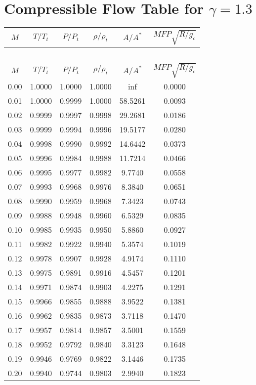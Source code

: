 \documentclass{article}
\begin{document}
\section*{Compressible Flow Table for $\gamma = 1.3$}
\begin{longtable}{cccccc}  %

\toprule
$M$ & $T/T_t$ & $P/P_t$ & $\rho/\rho_t$ & $A/A^*$ & $MFP\sqrt{R/g_c}$ \\
\midrule
\endfirsthead
\multicolumn{6}{c}{~} \\
\toprule
$M$ & $T/T_t$ & $P/P_t$ & $\rho/\rho_t$ & $A/A^*$ & $MFP\sqrt{R/g_c}$ \\
\midrule
\endhead
0.00 & 1.0000 & 1.0000 & 1.0000 & inf & 0.0000 \\
0.01 & 1.0000 & 0.9999 & 1.0000 & 58.5261 & 0.0093 \\
0.02 & 0.9999 & 0.9997 & 0.9998 & 29.2681 & 0.0186 \\
0.03 & 0.9999 & 0.9994 & 0.9996 & 19.5177 & 0.0280 \\
0.04 & 0.9998 & 0.9990 & 0.9992 & 14.6442 & 0.0373 \\
0.05 & 0.9996 & 0.9984 & 0.9988 & 11.7214 & 0.0466 \\
0.06 & 0.9995 & 0.9977 & 0.9982 & 9.7740 & 0.0558 \\
0.07 & 0.9993 & 0.9968 & 0.9976 & 8.3840 & 0.0651 \\
0.08 & 0.9990 & 0.9959 & 0.9968 & 7.3423 & 0.0743 \\
0.09 & 0.9988 & 0.9948 & 0.9960 & 6.5329 & 0.0835 \\
0.10 & 0.9985 & 0.9935 & 0.9950 & 5.8860 & 0.0927 \\
0.11 & 0.9982 & 0.9922 & 0.9940 & 5.3574 & 0.1019 \\
0.12 & 0.9978 & 0.9907 & 0.9928 & 4.9174 & 0.1110 \\
0.13 & 0.9975 & 0.9891 & 0.9916 & 4.5457 & 0.1201 \\
0.14 & 0.9971 & 0.9874 & 0.9903 & 4.2275 & 0.1291 \\
0.15 & 0.9966 & 0.9855 & 0.9888 & 3.9522 & 0.1381 \\
0.16 & 0.9962 & 0.9835 & 0.9873 & 3.7118 & 0.1470 \\
0.17 & 0.9957 & 0.9814 & 0.9857 & 3.5001 & 0.1559 \\
0.18 & 0.9952 & 0.9792 & 0.9840 & 3.3123 & 0.1648 \\
0.19 & 0.9946 & 0.9769 & 0.9822 & 3.1446 & 0.1735 \\
0.20 & 0.9940 & 0.9744 & 0.9803 & 2.9940 & 0.1823 \\

\end{longtable}
\end{document}
